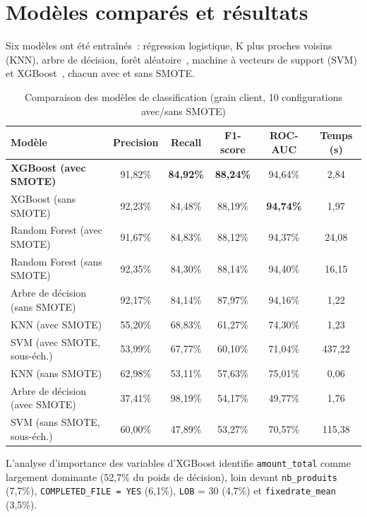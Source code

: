 \documentclass[11pt,a4paper]{report}
\begin{document}
\section{Mod\`eles compar\'es et r\'esultats}

Six mod\`eles ont \'et\'e entra\^in\'es~: r\'egression logistique, K plus proches
voisins (KNN), arbre de d\'ecision, for\^et al\'eatoire~\citep{breiman2001random},
machine \`a vecteurs de support (SVM) et
XGBoost~\citep{chen2016xgboost}, chacun avec et sans SMOTE.

\begin{table}[H]
\centering
\small
\begin{tabular}{lccccc}
\toprule
\textbf{Mod\`ele} & \textbf{Precision} & \textbf{Recall} & \textbf{F1-score} & \textbf{ROC-AUC} & \textbf{Temps (s)} \\
\midrule
\textbf{XGBoost (avec SMOTE)} & 91,82\% & \textbf{84,92\%} & \textbf{88,24\%} & 94,64\% & 2,84 \\
XGBoost (sans SMOTE) & 92,23\% & 84,48\% & 88,19\% & \textbf{94,74\%} & 1,97 \\
Random Forest (avec SMOTE) & 91,67\% & 84,83\% & 88,12\% & 94,37\% & 24,08 \\
Random Forest (sans SMOTE) & 92,35\% & 84,30\% & 88,14\% & 94,40\% & 16,15 \\
Arbre de d\'ecision (sans SMOTE) & 92,17\% & 84,14\% & 87,97\% & 94,16\% & 1,22 \\
KNN (avec SMOTE) & 55,20\% & 68,83\% & 61,27\% & 74,30\% & 1,23 \\
SVM (avec SMOTE, sous-\'ech.) & 53,99\% & 67,77\% & 60,10\% & 71,04\% & 437,22 \\
KNN (sans SMOTE) & 62,98\% & 53,11\% & 57,63\% & 75,01\% & 0,06 \\
Arbre de d\'ecision (avec SMOTE) & 37,41\% & 98,19\% & 54,17\% & 49,77\% & 1,76 \\
SVM (sans SMOTE, sous-\'ech.) & 60,00\% & 47,89\% & 53,27\% & 70,57\% & 115,38 \\
\bottomrule
\end{tabular}
\caption{Comparaison des mod\`eles de classification (grain client, 10 configurations avec/sans SMOTE)}
\label{tab:ml-results}
\end{table}

L'analyse d'importance des variables d'XGBoost identifie \texttt{amount\_total}
comme largement dominante (52,7\% du poids de d\'ecision), loin devant
\texttt{nb\_produits} (7,7\%), \texttt{COMPLETED\_FILE = YES} (6,1\%),
\texttt{LOB} = 30 (4,7\%) et \texttt{fixedrate\_mean} (3,5\%).
\end{document}
